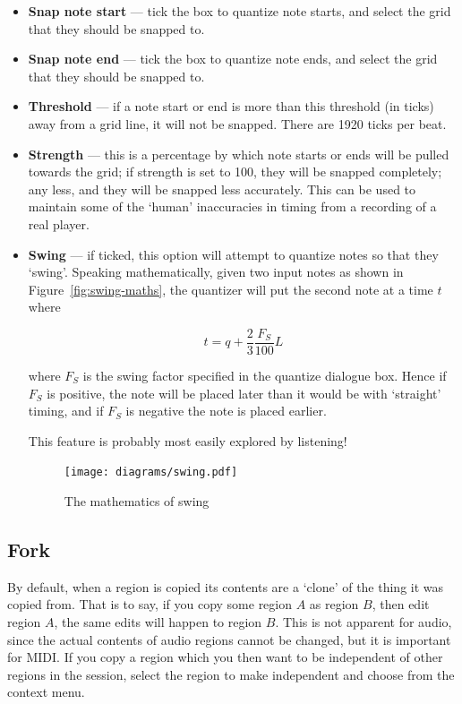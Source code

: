 \documentclass[10pt,a4paper]{book}
\newcommand{\menu}[1]{\emph{\StrSubstitute{#1}{,}{ $\rightarrow$ }}}
\begin{document}
{\begin{itemize}
\item \textbf{Snap note start} --- tick the box to quantize note
  starts, and select the grid that they should be snapped to.
\item \textbf{Snap note end} --- tick the box to quantize note
  ends, and select the grid that they should be snapped to.
\item \textbf{Threshold} --- if a note start or end is more than this
  threshold (in ticks) away from a grid line, it will not be snapped.
  There are 1920 ticks per beat.
\item \textbf{Strength} --- this is a percentage by which note starts
  or ends will be pulled towards the grid; if strength is set to 100,
  they will be snapped completely; any less, and they will be snapped
  less accurately.  This can be used to maintain some of the `human'
  inaccuracies in timing from a recording of a real player.
\item \textbf{Swing} --- if ticked, this option will attempt to
  quantize notes so that they `swing'.  Speaking mathematically, given
  two input notes as shown in Figure~\ref{fig:swing-maths}, the
  quantizer will put the second note at a time $t$ where

\begin{equation}
t = q + \frac{2}{3} \frac{F_S}{100} L
\end{equation}

where $F_S$ is the swing factor specified in the quantize dialogue
box.  Hence if $F_S$ is positive, the note will be placed later than
it would be with `straight' timing, and if $F_S$ is negative the note
is placed earlier.

This feature is probably most easily explored by listening!

\begin{figure}[ht]
\begin{center}
\texttt{[image: diagrams/swing.pdf]}
\end{center}
\caption{The mathematics of swing}
\label{fig:swing}
\end{figure}

\end{itemize}


\subsection{Fork}

By default, when a region is copied its contents are a `clone' of the
thing it was copied from.  That is to say, if you copy some region $A$
as region $B$, then edit region $A$, the same edits will happen to
region $B$.  This is not apparent for audio, since the actual contents
of audio regions cannot be changed, but it is important for MIDI.  If
you copy a region which you then want to be independent of other
regions in the session, select the region to make independent and
choose \menu{MIDI,Fork} from the context menu.


}
\end{document}
